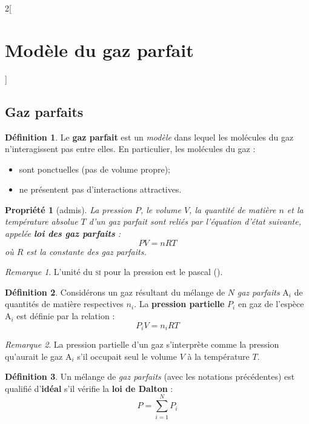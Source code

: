\documentclass[french]{book}
\newtheorem*{propriete}{Propriété}
\theoremstyle{definition}
\newtheorem*{definition}{Définition}
\theoremstyle{remark}
\newtheorem*{remarque}{Remarque}
\newcommand*{\point}[1]{\mathrm{#1}}
\newcommand*{\tdef}[1]{\textbf{#1}}
\newcommand*{\imp}[1]{\emph{#1}}
\newcommand*{\abr}[1]{\textsc{#1}}
\begin{document}
\begin{landscape}
\begin{multicols*}{2}[\section{Modèle du gaz parfait}]

\subsection{Gaz parfaits}

\begin{definition}
Le \tdef{gaz parfait} est un \imp{modèle} dans lequel les molécules du gaz n'interagissent pas entre elles. En particulier, les molécules du gaz :
\begin{itemize}
\item sont ponctuelles (pas de volume propre);
\item ne présentent pas d'interactions attractives.
\end{itemize}
\end{definition}

\begin{propriete}[admis]
La pression $P$, le volume $V$, la quantité de matière $n$ et la température absolue $T$ d'un \imp{gaz parfait} sont reliés par l'\imp{équation d'état} suivante, appelée \tdef{loi des gaz parfaits} :
\[PV = nRT\]
où $R$ est la constante des gaz parfaits.
\end{propriete}

\begin{remarque}
L'unité du \abr{si} pour la pression est le pascal (\pascal).
\end{remarque}

\begin{definition}
Considérons un gaz résultant du mélange de $N$ \imp{gaz parfaits} $\point{A}_i$ de quantités de matière respectives $n_i$. La \tdef{pression partielle} $P_i$ en gaz de l'espèce $\point{A}_i$ est définie par la relation :
\[P_i V = n_i RT\]
\end{definition}

\begin{remarque}
La pression partielle d'un gaz s'interprète comme la pression qu'aurait le gaz $\point{A}_i$ s'il occupait seul le volume $V$ à la température $T$.
\end{remarque}

\begin{definition}
Un mélange de \imp{gaz parfaits} (avec les notations précédentes) est qualifié d'\tdef{idéal} s'il vérifie la \tdef{loi de Dalton} :
\[P = \sum_{i = 1}^N P_i\]
\end{definition}


\end{multicols*}
\end{landscape}
\end{document}
